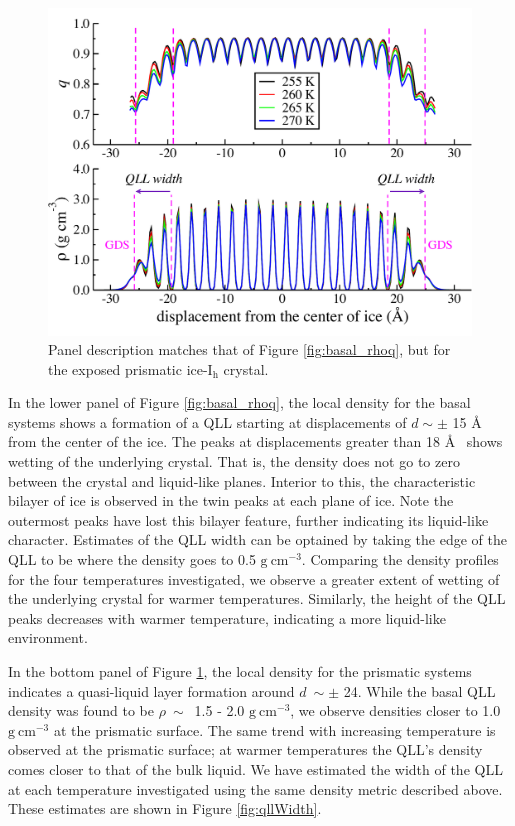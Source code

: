 \begin{figure}
\includegraphics[width=\linewidth]{Figures/prism_qdens}
\caption{\label{fig:prism_rhoq} Panel description matches that of
  Figure \ref{fig:basal_rhoq}, but for the exposed prismatic
  ice-I$_\mathrm{h}$ crystal. }
\end{figure}                

In the lower panel of Figure \ref{fig:basal_rhoq}, the local density
for the basal systems shows a formation of a QLL starting at
displacements of $d\sim\pm$ 15 \AA~ from the center of the ice. The
peaks at displacements greater than 18 \AA~ shows wetting of the
underlying crystal. That is, the density does not go to zero between
the crystal and liquid-like planes. Interior to this, the
characteristic bilayer of ice is observed in the twin peaks at each
plane of ice. Note the outermost peaks have lost this bilayer
feature, further indicating its liquid-like character. Estimates of
the QLL width can be optained by taking the edge of the QLL to be
where the density goes to 0.5 $\mathrm{g}~\mathrm{cm}^{-3}$. Comparing
the density profiles for the four temperatures investigated, we
observe a greater extent of wetting of the underlying crystal for
warmer temperatures. Similarly, the height of the QLL peaks decreases
with warmer temperature, indicating a more liquid-like environment.

In the bottom panel of Figure \ref{fig:prism_rhoq}, the local density
for the prismatic systems indicates a quasi-liquid layer formation
around $d~\sim\pm$ 24. While the basal QLL density was found to be
$\rho~ \sim$~1.5 - 2.0 $\mathrm{g}~\mathrm{cm}^{-3}$, we observe
densities closer to 1.0 $\mathrm{g}~\mathrm{cm}^{-3}$ at the prismatic
surface. The same trend with increasing temperature is observed at the
prismatic surface; at warmer temperatures the QLL's density comes
closer to that of the bulk liquid. We have estimated the width of the
QLL at each temperature investigated using the same density metric
described above. These estimates are shown in Figure
\ref{fig:qllWidth}.  

